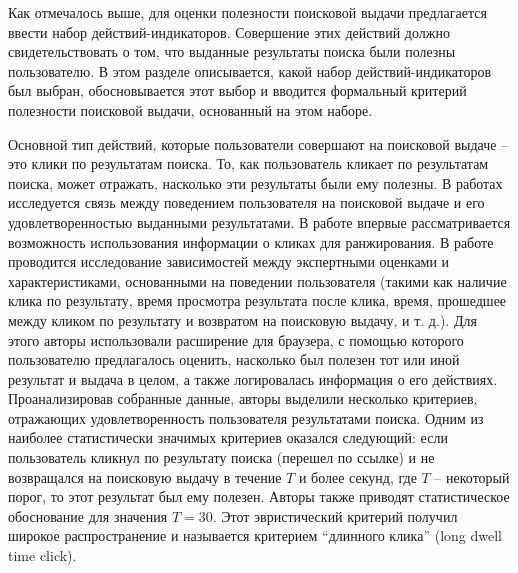 \documentclass[12pt,a4paper]{report}
\begin{document}
Как отмечалось выше, для оценки полезности поисковой выдачи предлагается ввести набор действий-индикаторов. Совершение этих действий должно свидетельствовать о том, что выданные результаты поиска были полезны пользователю. В этом разделе описывается, какой набор действий-индикаторов был выбран, обосновывается этот выбор и вводится формальный критерий полезности поисковой выдачи, основанный на этом наборе.

Основной тип действий, которые пользователи совершают на поисковой выдаче -- это клики по результатам поиска. То, как пользователь кликает по результатам поиска, может отражать, насколько эти результаты были ему полезны.
В работах \cite{Joachims, Fox-LDTClick, White, Kim} исследуется связь между поведением пользователя на поисковой выдаче и его удовлетворенностью выданными результатами. В работе \cite{Joachims} впервые рассматривается возможность использования информации о кликах для ранжирования. В работе \cite{Fox-LDTClick} проводится исследование зависимостей между экспертными оценками и характеристиками, основанными на поведении пользователя (такими как наличие клика по результату, время просмотра результата после клика, время, прошедшее между кликом по результату и возвратом на поисковую выдачу, и т. д.). Для этого авторы использовали расширение для браузера, с помощью которого пользователю предлагалось оценить, насколько был полезен тот или иной результат и выдача в целом, а также логировалась информация о его действиях. Проанализировав собранные данные, авторы выделили несколько критериев, отражающих удовлетворенность пользователя результатами поиска. Одним из наиболее статистически значимых критериев оказался следующий: если пользователь кликнул по результату поиска (перешел по ссылке) и не возвращался на поисковую выдачу в течение $T$ и более секунд, где $T$ -- некоторый порог, то этот результат был ему полезен. Авторы также приводят статистическое обоснование для значения $T=30$. Этот эвристический критерий получил широкое распространение \cite{White, Kim} и называется критерием ``длинного клика'' (long dwell time click).
\end{document}
